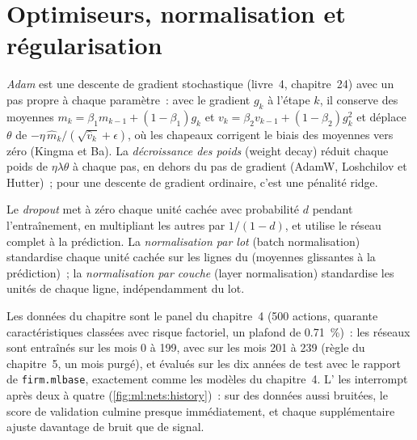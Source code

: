 \section{Optimiseurs, normalisation et régularisation}

\begin{definition}\label{def:ml:neural-networks-for-noisy-tabular-data:adam}
\emph{Adam} est une descente de gradient stochastique (livre~4, chapitre~24) avec un pas propre à chaque paramètre~: avec le gradient
$g_k$ à l'étape $k$, il conserve des moyennes $m_k = \beta_1m_{k-1} + (1-\beta_1)g_k$ et $v_k = \beta_2v_{k-1} + (1-\beta_2)g_k^2$
et déplace $\theta$ de $-\eta\,\hat m_k/(\sqrt{\hat v_k} + \epsilon)$, où les chapeaux corrigent le biais des moyennes vers zéro
(Kingma et Ba). La \emph{décroissance des poids} (weight decay) réduit chaque poids de $\eta\lambda\theta$ à chaque pas, en dehors
du pas de gradient (AdamW, Loshchilov et Hutter)~; pour une descente de gradient ordinaire, c'est une pénalité ridge.
\end{definition}

\begin{definition}\label{def:ml:neural-networks-for-noisy-tabular-data:dropout}
Le \emph{dropout} met à zéro chaque unité cachée avec probabilité $d$ pendant l'entraînement, en multipliant les autres par
$1/(1 - d)$, et utilise le réseau complet à la prédiction. La \emph{normalisation par lot} (batch normalisation) standardise
chaque unité cachée sur les lignes du  (moyennes glissantes à la prédiction)~; la \emph{normalisation par
couche} (layer normalisation) standardise les unités de chaque ligne, indépendamment du lot.
\end{definition}

Les données du chapitre sont le panel du chapitre~4 (500 actions, quarante caractéristiques classées avec risque factoriel, un plafond de
0.71~\%)~: les réseaux sont entraînés sur les mois 0 à 199, avec  sur les mois 201 à 239 (règle du chapitre~5, un
mois purgé), et évalués sur les dix années de test avec le rapport de \texttt{firm.mlbase}, exactement comme les modèles du chapitre~4.
L' les interrompt après deux à quatre  (\cref{fig:ml:nets:history})~: sur des données aussi bruitées, le
score de validation culmine presque immédiatement, et chaque  supplémentaire ajuste davantage de bruit que de signal.

